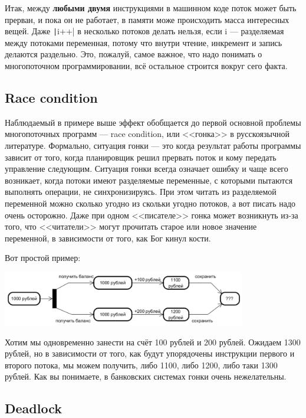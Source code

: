 \documentclass[a5paper]{article}
\begin{document}
Итак, между \textbf{любыми двумя} инструкциями в машинном коде поток может быть прерван, и пока он не работает, в памяти може происходить масса интересных вещей. Даже \texttt|i++| в несколько потоков делать нельзя, если i --- разделяемая между потоками переменная, потому что внутри чтение, инкремент и запись делаются раздельно. Это, пожалуй, самое важное, что надо понимать о многопоточном программировании, всё остальное строится вокруг сего факта.

\subsection{Race condition}

Наблюдаемый в примере выше эффект обобщается до первой основной проблемы многопоточных программ --- race condition, или <<гонка>> в русскоязычной литературе. Формально, ситуация гонки --- это когда результат работы программы зависит от того, когда планировщик решил прервать поток и кому передать управление следующим. Ситуация гонки всегда означает ошибку и чаще всего возникает, когда потоки имеют разделяемые переменные, с которыми пытаются выполнять операции, не синхронизируясь. При этом читать из разделяемой переменной можно сколько угодно из скольки угодно потоков, а вот писать надо очень осторожно. Даже при одном <<писателе>> гонка может возникнуть из-за того, что <<читатели>> могут прочитать старое или новое значение переменной, в зависимости от того, как Бог кинул кости.

Вот простой пример:

\begin{center}
    \includegraphics[width=0.8\textwidth]{raceCondition.png}
\end{center}

Хотим мы одновременно занести на счёт 100 рублей и 200 рублей. Ожидаем 1300 рублей, но в зависимости от того, как будут упорядочены инструкции первого и второго потока, мы можем получить, либо 1100, либо 1200, либо таки 1300 рублей. Как вы понимаете, в банковских системах гонки очень нежелательны.

\subsection{Deadlock}
\end{document}
